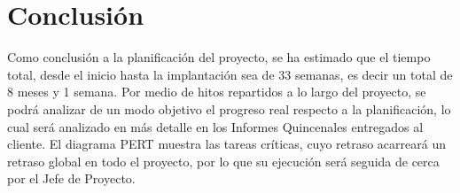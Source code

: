 \section{Conclusión}
\par Como conclusión a la planificación del proyecto, se ha estimado que el tiempo total,
desde el inicio hasta la implantación sea de 33 semanas, es decir un total de 8 meses y 1 semana.
Por medio de hitos repartidos a lo largo del proyecto, se podrá analizar de un modo objetivo el
progreso real respecto a la planificación, lo cual será analizado en más detalle en  los Informes
Quincenales entregados al cliente. El diagrama PERT muestra las tareas críticas, cuyo retraso
acarreará un retraso global en todo el proyecto, por lo que su ejecución será seguida de cerca
por el Jefe de Proyecto.
